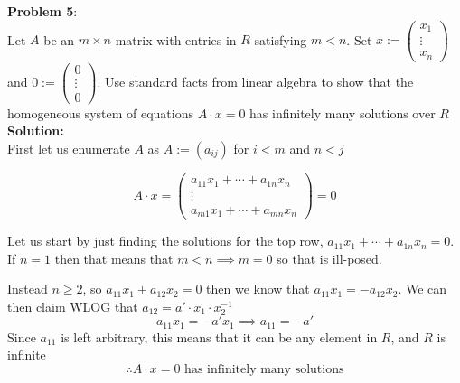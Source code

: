 \documentclass[11pt]{article}
\newcommand{\prob}[3]{\begin{flushleft}
        \textbf{Problem #1}: \\
        #2 
		\textbf{Solution:} 
		#3

\end{flushleft}}
\begin{document}
\prob{5}{
Let $A$ be an $m \times n$ matrix with entries in $R$ satisfying $m < n$. Set $x := \begin{pmatrix}
    x_1 \\ \vdots \\ x_n
  \end{pmatrix}$ and $0 := \begin{pmatrix}
    0 \\ \vdots \\ 0
  \end{pmatrix}$.
Use standard facts from linear algebra to show that the homogeneous system of equations $A \cdot x = 0$ has infinitely many
solutions over $R$ \\
}{ \\
First let us enumerate $A$ as $A := (a_{ij})$ for $i < m$ and $n < j$

$$A \cdot x = \begin{pmatrix}
    a_{11} x_1 + \cdots + a_{1n} x_n \\
    \vdots                           \\
    a_{m1} x_1 + \cdots + a_{mn} x_n
  \end{pmatrix} = 0$$


Let us start by just finding the solutions for the top row, $a_{11} x_1 + \cdots + a_{1n} x_n = 0$.
If $n = 1$ then that means that $m < n \implies m = 0$ so that is ill-posed.

Instead $n \geq 2$, so $a_{11} x_1 + a_{12} x_2 = 0$ then we know that $a_{11} x_1 = - a_{12} x_2$.
We can then claim WLOG that $a_{12} = a' \cdot x_1 \cdot x_2^{-1}$
$$a_{11} x_1 = - a' x_1 \implies a_{11} = -a'$$
Since $a_{11}$ is left arbitrary, this means that it can be any element in $R$, and $R$ is infinite
$$\therefore \text{$A \cdot x = 0$ has infinitely many solutions}$$

}
\end{document}
